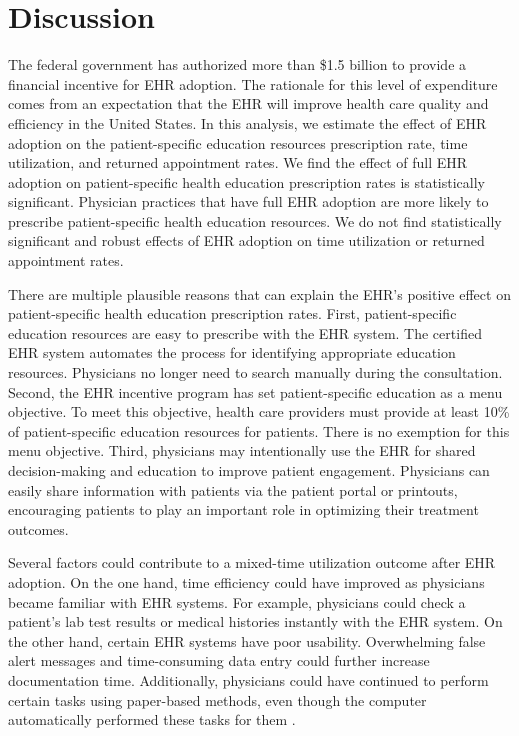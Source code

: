 \documentclass[12pt]{report}
\begin{document}
\chapter{Discussion}

\label{chapter:discussion}
The federal government has authorized more than \$1.5 billion to provide a financial incentive for EHR adoption. The rationale for this level of expenditure comes from an expectation that the EHR will improve health care quality and efficiency in the United States. In this analysis, we estimate the effect of EHR adoption on the patient-specific education resources prescription rate, time utilization, and returned appointment rates. We find the effect of full EHR adoption on patient-specific health education prescription rates is statistically significant. Physician practices that have full EHR adoption are more likely to prescribe patient-specific health education resources. We do not find statistically significant and robust effects of EHR adoption on time utilization or returned appointment rates.

There are multiple plausible reasons that can explain the EHR's positive effect on patient-specific health education prescription rates. First, patient-specific education resources are easy to prescribe with the EHR system. The certified EHR system automates the process for identifying appropriate education resources. Physicians no longer need to search manually during the consultation. Second, the EHR incentive program has set patient-specific education as a menu objective. To meet this objective, health care providers must provide at least 10\% of patient-specific education resources for patients. There is no exemption for this menu objective. Third, physicians may intentionally use the EHR for shared decision-making and education to improve patient engagement. Physicians can easily share information with patients via the patient portal or printouts, encouraging patients to play an important role in optimizing their treatment outcomes.

Several factors could contribute to a mixed-time utilization outcome after EHR adoption. On the one hand, time efficiency could have improved as physicians became familiar with EHR systems. For example, physicians could check a patient's lab test results or medical histories instantly with the EHR system. On the other hand, certain EHR systems have poor usability. Overwhelming false alert messages and time-consuming data entry could further increase documentation time. Additionally, physicians could have continued to perform certain tasks using paper-based methods, even though the computer automatically performed these tasks for them \citep{overhage2001controlled}.
\end{document}
